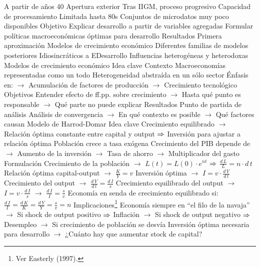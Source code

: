 \documentclass{nuevotema}
\begin{document}
\begin{esquemal}
				\4[] A partir de años 40
				\4 Apertura exterior
				\4[] Tras IIGM, proceso progresivo
				\4 Capacidad de procesamiento
				\4[] Limitada hasta 80s
				\4[] Conjuntos de microdatos muy poco disponibles
			\3 Objetivo
				\4 Explicar desarrollo a partir de variables agregadas
				\4 Formular políticas macroeconómicas óptimas para desarrollo
			\3 Resultados
				\4 Primera aproximación
				\4[] Modelos de crecimiento económico
				\4 Diferentes familias de modelos posteriores
				\4[] Idiosincráticos a EDesarrollo
				\4 Influencias heterogéneas y heterodoxas
		\2 Modelos de crecimiento económico
			\3 Idea clave
				\4 Contexto
				\4[] Macroeconomías representadas como un todo
				\4[] Heterogeneidad abstraída en un sólo sector
				\4[] Énfasis en:
				\4[] $\to$ Acumulación de factores de producción
				\4[] $\to$ Crecimiento tecnológico
				\4 Objetivos
				\4[] Entender efecto de ff.pp. sobre crecimiento
				\4[] $\to$ Hasta qué punto es responsable
				\4[] $\to$ Qué parte no puede explicar
				\4 Resultados
				\4[] Punto de partida de análisis
				\4[] Análisis de convergencia
				\4[] $\to$ En qué contexto es posible
				\4[] $\to$ Qué factores causan
			\3 Modelo de Harrod-Domar
				\4 Idea clave
				\4[] Crecimiento equilibrado
				\4[] $\to$ Relación óptima constante entre capital y output
				\4[] $\Rightarrow$ Inversión para ajustar a relación óptima
				\4[] Población crece a tasa exógena
				\4[] Crecimiento del PIB depende de
				\4[] $\to$ Aumento de la inversión
				\4[] $\to$ Tasa de ahorro $\to$ Multiplicador del gasto
				\4 Formulación
				\4[] Crecimiento de la población
				\4[] $\to$ $L(t) = L(0) \cdot e^{nt}$
				\4[] $\Rightarrow$ $\frac{d \, L}{L} = n \cdot d \, t$
				\4[] Relación óptima capital-output
				\4[] $\to$ $\frac{K}{Y} = v$
				\4[] Inversión óptima
				\4[] $\to$ $I=v \cdot \frac{d \, Y}{d \, t}$
				\4[] Crecimiento del output
				\4[] $\to$ $\frac{d \, Y}{d \, t} = \frac{d \, I}{s}$
				\4[] Crecimiento equilibrado del output
				\4[] $\to$ $I = v\cdot \frac{d \, I}{s}$ $\to$ $\frac{d\, I}{I} = \frac{s}{v}$
				\4[] Economía en senda de crecimiento equilibrado si:
				\4[] $\frac{d \, I}{I} = \frac{d \, K}{K} = \frac{d \, Y}{Y} = \frac{s}{v} = n$
				\4 Implicaciones\footnote{Ver Easterly (1997).}
				\4[] Economía siempre en ``el filo de la navaja''
				\4[] $\to$ Si shock de output positivo $\Rightarrow$ Inflación
				\4[] $\to$ Si shock de output negativo $\Rightarrow$ Desempleo
				\4[] $\to$ Si crecimiento de población se desvía
				\4[] Inversión óptima necesaria para desarrollo
				\4[] $\to$ ¿Cuánto hay que aumentar stock de capital?

\end{esquemal}
\end{document}

